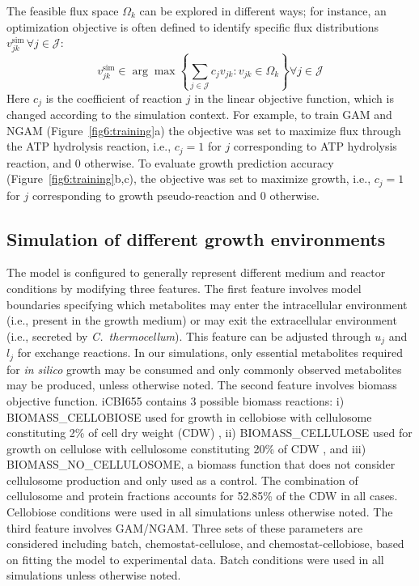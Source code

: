 The feasible flux space $\Omega_k$ can be explored in different ways;\citep{trinh2009,palsson2015} for instance, an optimization objective is often defined to identify specific flux distributions $v_{jk}^{\text{sim}}\, \forall j \in \mathcal{J}$:
\begin{equation}
    v_{jk}^{\text{sim}} \in \arg \max \left\{ \sum_{j \in \mathcal{J}} c_j v_{jk}: v_{jk} \in \Omega_k \right\}  \forall j \in \mathcal{J} \label{eq:fba}
\end{equation}
Here $c_j$ is the coefficient of reaction $j$ in the linear objective function, which is changed according to the simulation context. For example, to train GAM and NGAM (Figure~\ref{fig6:training}a) the objective was set to maximize flux through the ATP hydrolysis reaction, i.e., $c_j=1$ for $j$ corresponding to ATP hydrolysis reaction,  and 0 otherwise. To evaluate growth prediction accuracy (Figure~\ref{fig6:training}b,c), the objective was set to maximize growth, i.e., $c_j=1$ for $j$ corresponding to growth pseudo-reaction and 0 otherwise.

\subsection{Simulation of different growth environments}
The model is configured to generally represent different medium and reactor conditions by modifying three features.
The first feature involves model boundaries specifying which metabolites may enter the intracellular environment (i.e., present in the growth medium) or may exit the extracellular environment (i.e., secreted by \textit{C.~thermocellum}). This feature can be adjusted through $u_j$ and $l_j$ for exchange reactions.
In our simulations, only essential metabolites required for \textit{in silico} growth may be consumed and only commonly observed metabolites may be produced, unless otherwise noted.
The second feature involves biomass objective function. iCBI655 contains 3 possible biomass reactions: i) BIOMASS\_CELLOBIOSE used for growth in cellobiose with cellulosome constituting 2\% of cell dry weight (CDW) \citep{zhang2005}, ii) BIOMASS\_CELLULOSE used for growth on cellulose with cellulosome constituting 20\% of CDW  \citep{zhang2005}, and iii)
BIOMASS\_NO\_CELLULOSOME, a biomass function that does not consider cellulosome production and only used as a control. The combination of cellulosome and protein fractions accounts for 52.85\% of the CDW in all cases. \citep{roberts2010, thompson2015}
Cellobiose conditions were used in all simulations unless otherwise noted.
The third feature involves GAM/NGAM. Three sets of these parameters are considered including batch, chemostat-cellulose, and chemostat-cellobiose, based on fitting the model to experimental data.
Batch conditions were used in all simulations unless otherwise noted.

